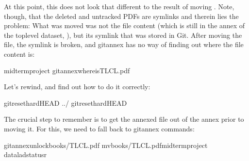 \sphinxAtStartPar
At this point, this does not look that different to the result of moving
. Note, though, that the deleted and untracked PDFs are symlinks \textendash{}
and therein lies the problem: What was moved was not the file content (which is
still in the annex of the top\sphinxhyphen{}level dataset, ), but its symlink that
was stored in Git. After moving the file, the symlink is broken, and git\sphinxhyphen{}annex
has no way of finding out where the file content is:

\begin{sphinxVerbatim}[commandchars=\\\{\}]
midterm\PYGZus{}project
gitannexwhereisTLCL.pdf
\end{sphinxVerbatim}

\sphinxAtStartPar
Let’s rewind, and find out how to do it correctly:

\newpage

\begin{sphinxVerbatim}[commandchars=\\\{\}]
gitreset\PYGZhy{}\PYGZhy{}hardHEAD\PYGZti{}
../
gitreset\PYGZhy{}\PYGZhy{}hardHEAD\PYGZti{}
\end{sphinxVerbatim}

\sphinxAtStartPar
The crucial step to remember is to get the annexed file out of the annex prior
to moving it. For this, we need to fall back to git\sphinxhyphen{}annex commands:

\begin{sphinxVerbatim}[commandchars=\\\{\}]
gitannexunlockbooks/TLCL.pdf
mvbooks/TLCL.pdfmidterm\PYGZus{}project
dataladstatus\PYGZhy{}r
\end{sphinxVerbatim}

